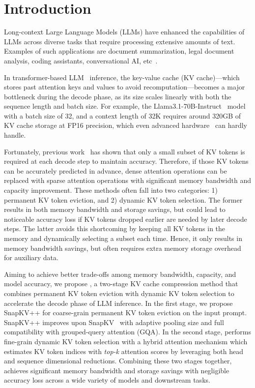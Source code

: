 \section{Introduction}
\label{sec:1-intro}

Long-context Large Language Models (LLMs) have enhanced the capabilities of LLMs across diverse tasks that require processing extensive amounts of text. 
Examples of such applications are document summarization, legal document analysis, coding assistants, conversational AI, etc~\cite{wwhlc2024, lost2024, huang2023advancing}. 


In transformer-based LLM~\cite{attention2017} inference, the key-value cache (KV cache)—which stores past attention keys and values to avoid recomputation—becomes a major bottleneck during the decode phase, as its size scales linearly with both the sequence length and batch size. 
For example, the Llama3.1-70B-Instruct~\cite{metaai2024} model with a batch size of 32, and a context length of 32K requires around 320GB of KV cache storage at FP16 precision, which even advanced hardware~\cite{nvidia_h100, tpuv42023, amd_mi300x} can hardly handle.

 
Fortunately, previous work~\cite{h2o2024, quest2024, sparq2024, snapkv2024, loki2024, modeldiscard2024} has shown that only a small subset of KV tokens is required at each decode step to maintain accuracy. Therefore, if those KV tokens can be accurately predicted in advance, dense attention operations can be replaced with sparse attention operations with significant memory bandwidth and capacity improvement. These methods often fall into two categories: 1) permanent KV token eviction, and 2) dynamic KV token selection. The former results in both memory bandwidth and storage savings, but could lead to noticeable accuracy loss if KV tokens dropped earlier are needed by later decode steps. The latter avoids this shortcoming by keeping all KV tokens in the memory and dynamically selecting a subset each time. Hence, it only results in memory bandwidth savings, but often requires extra memory storage overhead for auxiliary data.

Aiming to achieve better trade-offs among memory bandwidth, capacity, and model accuracy, we propose \rocketkv, a two-stage KV cache compression method that combines permanent KV token eviction with dynamic KV token selection to accelerate the decode phase of LLM inference.
In the first stage, we propose SnapKV++ for coarse-grain permanent KV token eviction on the input prompt. SnapKV++ improves upon SnapKV~\cite{snapkv2024} with adaptive pooling size and full compatibility with grouped-query attention (GQA).
In the second stage, \rocketkv performs fine-grain dynamic KV token selection with a hybrid attention mechanism which estimates KV token indices with \textit{top-k} attention scores by leveraging both head and sequence dimensional reductions. 
Combining these two stages together, \rocketkv achieves significant memory bandwidth and storage savings with negligible accuracy loss across a wide variety of models and downstream tasks.

